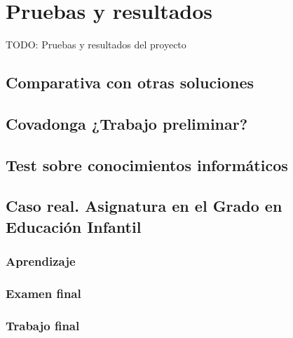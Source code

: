 \chapter{Pruebas y resultados\label{sec:pruebasYResultados}}

TODO: Pruebas y resultados del proyecto

\section{Comparativa con otras soluciones}

\section{Covadonga ¿Trabajo preliminar?}

\section{Test sobre conocimientos informáticos}

\section{Caso real. Asignatura en el Grado en Educación Infantil}

\subsection{Aprendizaje}
\subsection{Examen final}
\subsection{Trabajo final}